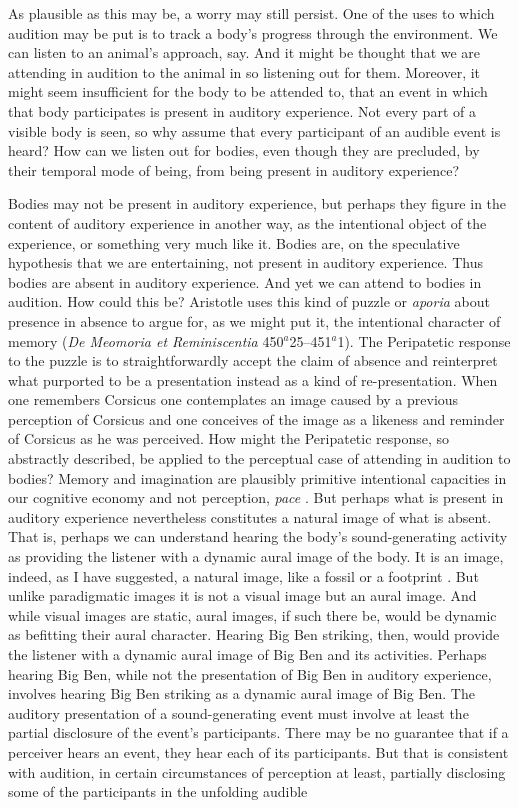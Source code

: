 As plausible as this may be, a worry may still persist. One of the uses to which audition may be put is to track a body's progress through the environment. We can listen to an animal's approach, say. And it might be thought that we are attending in audition to the animal in so listening out for them. Moreover, it might seem insufficient for the body to be attended to, that an event in which that body participates is present in auditory experience. Not every part of a visible body is seen, so why assume that every participant of an audible event is heard? How can we listen out for bodies, even though they are precluded, by their temporal mode of being, from being present in auditory experience? 

Bodies may not be present in auditory experience, but perhaps they figure in the content of auditory experience in another way, as the intentional object of the experience, or something very much like it. Bodies are, on the speculative hypothesis that we are entertaining, not present in auditory experience. Thus bodies are absent in auditory experience. And yet we can attend to bodies in audition. How could this be? Aristotle uses this kind of puzzle or \emph{aporia} about presence in absence to argue for, as we might put it, the intentional character of memory (\emph{De Meomoria et Reminiscentia} 450\( ^{a} \)25--451\( ^{a} \)1). The Peripatetic response to the puzzle is to straightforwardly accept the claim of absence and reinterpret what purported to be a presentation instead as a kind of re-presentation. When one remembers Corsicus one contemplates an image caused by a previous perception of Corsicus and one conceives of the image as a likeness and reminder of Corsicus as he was perceived. How might the Peripatetic response, so abstractly described, be applied to the perceptual case of attending in audition to bodies? Memory and imagination are plausibly primitive intentional capacities in our cognitive economy and not perception, \emph{pace} \citet{Burge:2010uq}. But perhaps what is present in auditory experience nevertheless constitutes a natural image of what is absent. That is, perhaps we can understand hearing the body's sound-generating activity as providing the listener with a dynamic aural image of the body. It is an image, indeed, as I have suggested, a natural image, like a fossil or a footprint \citep[for a recent general discussion of images see][]{Kulvicki:2014hb}. But unlike paradigmatic images it is not a visual image but an aural image. And while visual images are static, aural images, if such there be, would be dynamic as befitting their aural character. Hearing Big Ben striking, then, would provide the listener with a dynamic aural image of Big Ben and its activities. Perhaps hearing Big Ben, while not the presentation of Big Ben in auditory experience, involves hearing Big Ben striking as a dynamic aural image of Big Ben. The auditory presentation of a sound-generating event must involve at least the partial disclosure of the event's participants. There may be no guarantee that if a perceiver hears an event, they hear each of its participants. But that is consistent with audition, in certain circumstances of perception at least, partially disclosing some of the participants in the unfolding audible 